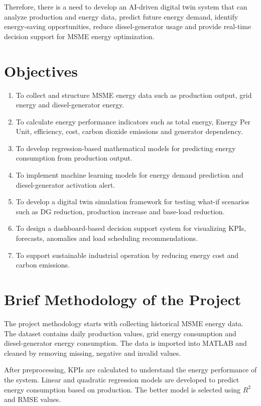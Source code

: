 Therefore, there is a need to develop an AI-driven digital twin system that can analyze production and energy data, predict future energy demand, identify energy-saving opportunities, reduce diesel-generator usage and provide real-time decision support for MSME energy optimization.

\section{Objectives}
\begin{enumerate}
    \item To collect and structure MSME energy data such as production output, grid energy and diesel-generator energy.
    \item To calculate energy performance indicators such as total energy, Energy Per Unit, efficiency, cost, carbon dioxide emissions and generator dependency.
    \item To develop regression-based mathematical models for predicting energy consumption from production output.
    \item To implement machine learning models for energy demand prediction and diesel-generator activation alert.
    \item To develop a digital twin simulation framework for testing what-if scenarios such as DG reduction, production increase and base-load reduction.
    \item To design a dashboard-based decision support system for visualizing KPIs, forecasts, anomalies and load scheduling recommendations.
    \item To support sustainable industrial operation by reducing energy cost and carbon emissions.
\end{enumerate}

\section{Brief Methodology of the Project}
The project methodology starts with collecting historical MSME energy data. The dataset contains daily production values, grid energy consumption and diesel-generator energy consumption. The data is imported into MATLAB and cleaned by removing missing, negative and invalid values.

After preprocessing, KPIs are calculated to understand the energy performance of the system. Linear and quadratic regression models are developed to predict energy consumption based on production. The better model is selected using $R^2$ and RMSE values.

